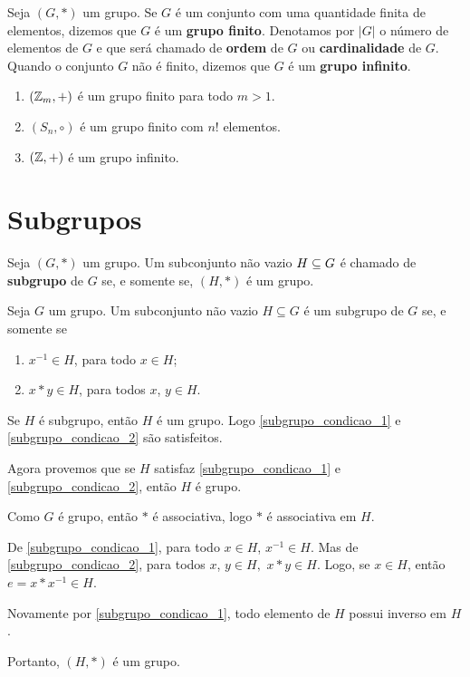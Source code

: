 \begin{definicao}
    Seja $(G,*)$ um grupo. Se $G$ {\'e} um conjunto com uma quantidade finita de elementos, dizemos que $G$ {\'e} um \textbf{grupo finito}. Denotamos por $|G|$ o n{\'u}mero de elementos de $G$ e que ser{\'a} chamado de \textbf{ordem} de $G$ ou \textbf{cardinalidade} de $G$. Quando o conjunto $G$ n{\~a}o {\'e} finito, dizemos que $G$ {\'e} um \textbf{grupo infinito}.
\end{definicao}

\begin{exemplos}
    \begin{enumerate}[label={\arabic*})]
        \item $(\mathbb{Z}_m, +)$ {\'e} um grupo finito para todo $m>1$.
        \item $(S_n, \circ)$ \'e um grupo finito com $n!$ elementos.
        \item $(\mathbb{Z}, +)$ {\'e} um grupo infinito.
    \end{enumerate}
\end{exemplos}

\section{Subgrupos} %
\label{sec:subgrupos}

\begin{definicao}
    Seja $(G,*)$ um grupo. Um subconjunto n{\~a}o vazio $H\subseteq G$ {\'e} chamado de \textbf{subgrupo} de $G$ se, e somente se, $(H,*)$ {\'e} um grupo.
\end{definicao}

\begin{proposicao}
    Seja $G$ um grupo. Um subconjunto n{\~a}o vazio $H\subseteq G$ {\'e} um subgrupo de $G$ se, e somente se
    \begin{enumerate}[label={\roman*})]
        \item\label{subgrupo_condicao_1} $x^{-1}\in H$, para todo $x \in H$;
        \item\label{subgrupo_condicao_2} $x*y\in H$, para todos $x$, $y \in H$.
    \end{enumerate}
\end{proposicao}
\begin{prova}
    Se $H$ {\'e} subgrupo, ent{\~a}o $H$ {\'e} um grupo. Logo \ref{subgrupo_condicao_1} e \ref{subgrupo_condicao_2} s{\~a}o satisfeitos.

    Agora provemos que se $H$ satisfaz \ref{subgrupo_condicao_1} e \ref{subgrupo_condicao_2}, ent{\~a}o $H$ {\'e} grupo.

    Como $G$ {\'e} grupo, ent{\~a}o $*$ {\'e} associativa, logo $*$ {\'e} associativa em $H$.

    De \ref{subgrupo_condicao_1}, para todo $x \in H$, $x^{-1}\in H$. Mas de \ref{subgrupo_condicao_2}, para todos $x$, $y \in H,$ $x*y \in H$. Logo, se $x\in H$, ent{\~a}o $e = x*x^{-1} \in H$.

    Novamente por \ref{subgrupo_condicao_1}, todo elemento de $H$ possui inverso em $H$.

    Portanto, $(H,*)$ {\'e} um grupo.
\end{prova}


